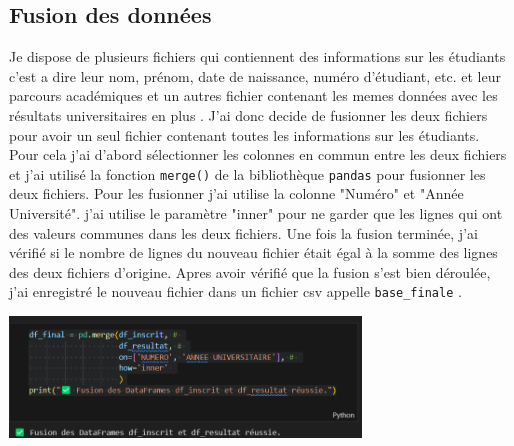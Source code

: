 \subsection{Fusion des données}
Je dispose de plusieurs  fichiers 
qui contiennent des informations sur les étudiants c'est a dire leur nom, prénom, date de naissance, numéro d'étudiant, etc.
et leur parcours académiques et un autres fichier contenant les memes données avec les résultats universitaires en plus . J'ai donc decide de fusionner les deux fichiers pour avoir un seul fichier contenant toutes les informations sur les étudiants. 
Pour cela j'ai d'abord sélectionner les colonnes en commun entre les deux fichiers et j'ai utilisé la fonction \texttt{merge()} de la bibliothèque \texttt{pandas} pour fusionner les deux fichiers. 
Pour les fusionner  j'ai utilise la colonne "Numéro" et "Année Université". j'ai utilise le paramètre "inner" pour ne garder que les lignes qui ont des valeurs communes dans les deux fichiers. Une fois la fusion terminée, j'ai vérifié si le nombre de lignes du nouveau fichier était égal à la somme des lignes des deux fichiers d'origine. Apres avoir vérifié que la fusion s'est bien déroulée, j'ai enregistré le nouveau fichier dans un fichier csv appelle \texttt{base\_finale} . 
\begin{center}
    \includegraphics[width=0.7\textwidth]{image/14.png} 
\end{center} 

